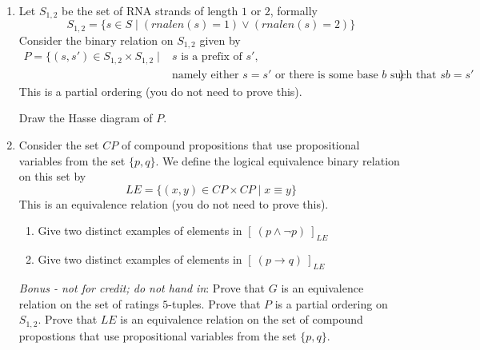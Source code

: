 \begin{enumerate}
\begin{enumerate}
    Recall that the {\bf equivalence class} of an element $x \in X$ for an equivalence relation $\sim$ on the set $X$ 
    is the set $\{s \in X | (x, s) \in \sim \}$. We write this as $[x]_\sim$.
    
    \begin{enumerate}
        \item Find a ratings $5$-tuple $v$ such that $[v]_{G} = \{v \}$.
        \item Find distinct ratings $5$-tuples $u_1, u_2$ ($u_1 \neq u_2$) whose equivalence classes $[u_1]_{G}$ and $[u_2]_{G}$ have the same size.
        \item Find distinct ratings $5$-tuples $w_1, w_2$ ($w_1 \neq w_2$) whose equivalence classes $[w_1]_{G}$ and $[w_2]_{G}$ have different sizes.
    \end{enumerate}

    \item Let $S_{1,2}$ be the set of RNA strands of length $1$ or $2$, formally 
        \[
            S_{1,2} = \{ s \in S \mid ( rnalen(s) = 1) \lor (rnalen(s) = 2)\}
        \]
    Consider the binary relation on $S_{1,2}$ given by
    \begin{align*}
        P = \{ (s, s') \in S_{1,2} \times S_{1,2} \mid &\text{$s$ is a prefix of $s'$, }\\
        &\text{namely either $s = s'$ or there is 
        some base $b$ such that $sb=s'$} \}
    \end{align*}
    This is a partial ordering (you do not need to prove this).

    Draw the Hasse diagram of $P$.

    \item Consider the set $CP$ of compound propositions that use propositional variables from the set $\{p,q\}$.
    We define the logical equivalence binary relation on this set by 
    \[
        LE = \{ (x, y) \in CP \times CP \mid x \equiv y \}
    \]
    This is an equivalence relation (you do not need to prove this).

    \begin{enumerate}
        \item Give two distinct examples of elements in $[~(p \land \lnot p)~]_{LE}$
        \item Give two distinct examples of elements in $[~(p \to q)~]_{LE}$
    \end{enumerate}

    {\it Bonus - not for credit; do not hand in}: 
    Prove that $G$ is an equivalence relation on
    the set of ratings $5$-tuples.
    Prove that $P$ is a partial ordering on $S_{1,2}$.
    Prove that $LE$ is an equivalence relation on 
    the set of compound propostions that use propositional variables from 
    the set $\{p,q\}$.




\end{enumerate}
\end{enumerate}

